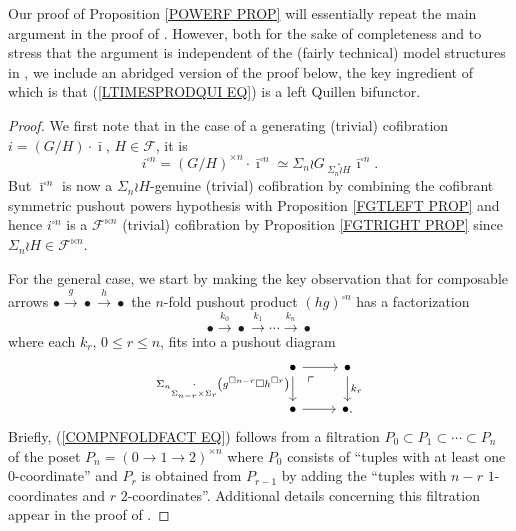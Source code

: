 \documentclass[a4paper,10pt]{article}%
\begin{document}
Our proof of Proposition \ref{POWERF PROP} will essentially repeat the main argument in the proof of
\cite[Thm. 1.2]{Pe16}.
However, both for the sake of completeness and to stress that the argument is independent of the (fairly technical) model structures in \cite{Pe16}, we include an abridged version of the proof below, the key ingredient 
of which is that (\ref{LTIMESPRODQUI EQ}) is a left Quillen bifunctor. 


\begin{proof}
	We first note that in the case of a generating
	(trivial) cofibration
	$i = (G/H) \cdot \bar{\imath}$, $H\in \mathcal{F}$, it is 
	\[i^{\square n} = 
	(G/H)^{\times n} \cdot \bar{\imath}^{\square n}
	\simeq \Sigma_n \wr G 
	\underset{\Sigma_n \wr H}{\cdot} \bar{\imath}^{\square n}.\]
But $\bar{\imath}^{\square n}$ is now a $\Sigma_n \wr H$-genuine (trivial) cofibration by 
combining the cofibrant symmetric pushout powers hypothesis with Proposition \ref{FGTLEFT PROP}
 and hence 
$i^{\square n}$ is a $\mathcal{F}^{\ltimes n}$ 
(trivial) cofibration by Proposition \ref{FGTRIGHT PROP}
since $\Sigma_n \wr H \in \mathcal{F}^{\ltimes n}$.

	For the general case, we start by making the key observation that for composable arrows 
	$\bullet \xrightarrow{g} \bullet \xrightarrow{h} \bullet$ the $n$-fold pushout product $(hg)^{\square n}$ has a factorization
\begin{equation}\label{COMPNFOLDFACT EQ}
	\bullet
		\xrightarrow{k_0}
	\bullet
		\xrightarrow{k_1}
	\cdots
		\xrightarrow{k_n}
	\bullet
\end{equation}
where each $k_r$, $0 \leq r \leq n$, fits into a pushout diagram
\begin{equation}\label{COMPNFOLDFACTPUSH EQ}
\begin{tikzcd}
	\bullet \ar{r} \ar{d}[swap] 
	{\Sigma_n \underset{\Sigma_{n-r} \times \Sigma_r}
	{\cdot}\left( g^{\square n-r} \square h^{\square r} \right)} 
	\ar[dr,phantom, "\ulcorner", near start]
	&
	\bullet \ar{d}{k_r}
\\
	\bullet \ar{r} 
	&
	\bullet.
\end{tikzcd}
\end{equation}
Briefly, (\ref{COMPNFOLDFACT EQ}) follows from
a filtration 
$P_0 \subset P_1 \subset \cdots \subset P_n$
of the poset $P_n = (0 \to 1 \to 2)^{\times n}$ 
where $P_0$ consists of ``tuples with at least one $0$-coordinate'' and $P_r$ is obtained from $P_{r-1}$ by adding the ``tuples with $n-r$ $1$-coordinates and $r$ $2$-coordinates''.
Additional details concerning this filtration appear in the proof of \cite[Lemma 4.8]{Pe16}.


\end{proof}
\end{document}

